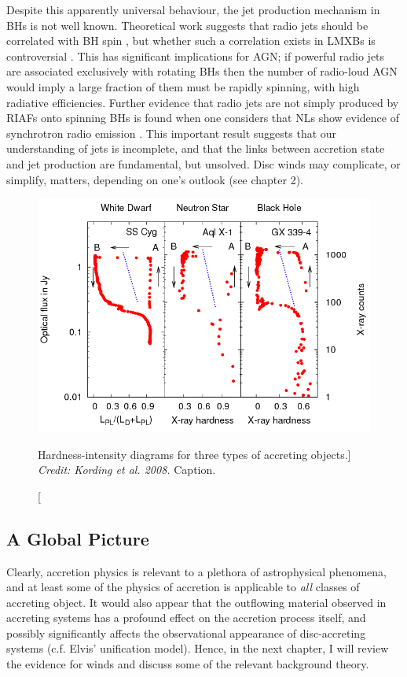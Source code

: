 Despite this apparently universal behaviour, 
the jet production mechanism in BHs is not well known. 
Theoretical work suggests that radio jets should be correlated with BH spin 
\citep{penrose1971,blandford1977}, 
but whether such a correlation exists in LMXBs is 
controversial \citep{fender2010,narayan2012}.
This has significant implications for AGN; if powerful radio jets are 
associated exclusively with rotating BHs then the number of radio-loud AGN
would imply a large fraction of them must be rapidly spinning, with
high radiative efficiencies. 
Further evidence that radio jets are not simply produced by RIAFs onto spinning
BHs is found when one considers that NLs show evidence of synchrotron
radio emission \citep{coppejans2015}. This important result suggests that our understanding
of jets is incomplete, and that the links between accretion state and 
jet production are fundamental, but unsolved. Disc winds may complicate, or simplify,
matters, depending on one's outlook (see chapter 2).

\begin{figure}
\centering
\includegraphics[width=1.0\textwidth]{figures/01-intro/kording_hid.png}
\caption
[Hardness-intensity diagrams for three types of accreting objects.]
{
{\sl Credit: Kording et al. 2008.} 
Caption.
} 
\label{fig:kording_hid}
\end{figure}

\subsection{A Global Picture}

Clearly, accretion physics is relevant to a plethora of astrophysical phenomena, 
and at least some of the physics of accretion is applicable to {\em all} 
classes of accreting object. 
It would also appear that the outflowing material observed in accreting systems 
has a profound effect on the accretion process itself, and 
possibly significantly affects the observational 
appearance of disc-accreting systems (c.f. Elvis' unification model). 
Hence, in the next chapter, I will review the evidence for
winds and discuss some of the relevant background theory.

